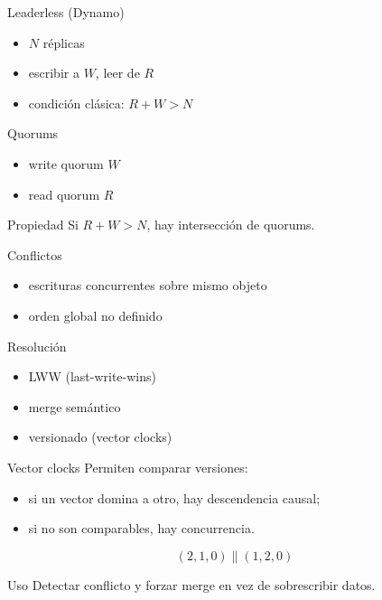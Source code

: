 \documentclass[institutional,screen,none]{ua-engineering-v6-beamer}
\begin{document}
\begin{frame}{Leaderless (Dynamo)}
\begin{itemize}
\item $N$ réplicas
\item escribir a $W$, leer de $R$
\item condición clásica: $R+W>N$
\end{itemize}
\end{frame}

\begin{frame}{Quorums}
\begin{itemize}
\item write quorum $W$
\item read quorum $R$
\end{itemize}

\pause
\begin{block}{Propiedad}
Si $R+W>N$, hay intersección de quorums.
\end{block}
\end{frame}


\begin{frame}{Conflictos}
\begin{itemize}
\item escrituras concurrentes sobre mismo objeto
\item orden global no definido
\end{itemize}
\end{frame}

\begin{frame}{Resolución}
\begin{itemize}
\item LWW (last-write-wins)
\item merge semántico
\item versionado (vector clocks)
\end{itemize}
\end{frame}

\begin{frame}{Vector clocks}
Permiten comparar versiones:
\begin{itemize}
\item si un vector domina a otro, hay descendencia causal;
\item si no son comparables, hay concurrencia.
\end{itemize}

\pause
\[
(2,1,0) \parallel (1,2,0)
\]

\begin{block}{Uso}
Detectar conflicto y forzar merge en vez de sobrescribir datos.
\end{block}
\end{frame}
\end{document}
